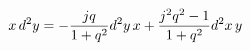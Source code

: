 \begin{equation}
x\, d^{2}y=-\frac{jq}{1+q^{2}}d^{2}y\, x+\frac{j^{2}q^{2}-1}{%
1+q^{2}}d^{2}x\, y
\end{equation}


